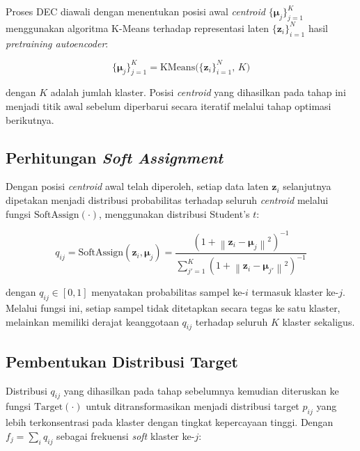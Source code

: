 Proses DEC diawali dengan menentukan posisi awal \textit{centroid}
$\{\boldsymbol{\mu}_j\}_{j=1}^{K}$ menggunakan algoritma K-Means
terhadap representasi laten $\{\mathbf{z}_i\}_{i=1}^{N}$ hasil
\textit{pretraining autoencoder}:

\begin{equation}
    \{\boldsymbol{\mu}_j\}_{j=1}^{K} = \text{KMeans}\big(\{\mathbf{z}_i\}_{i=1}^{N},\, K\big)
    \label{eq:kmeans_init}
\end{equation}

\noindent dengan $K$ adalah jumlah klaster. Posisi \textit{centroid} yang
dihasilkan pada tahap ini menjadi titik awal sebelum diperbarui secara
iteratif melalui tahap optimasi berikutnya.

\subsection{Perhitungan \textit{Soft Assignment}}

Dengan posisi \textit{centroid} awal telah diperoleh, setiap data laten
$\mathbf{z}_i$ selanjutnya dipetakan menjadi distribusi probabilitas
terhadap seluruh \textit{centroid} melalui fungsi
$\text{SoftAssign}(\cdot)$, menggunakan distribusi Student's $t$:

\begin{equation}
    q_{ij} = \text{SoftAssign}(\mathbf{z}_i, \boldsymbol{\mu}_j)
    = \frac{\left(1 + \left\|\mathbf{z}_i -
    \boldsymbol{\mu}_j\right\|^2\right)^{-1}}
    {\displaystyle\sum_{j'=1}^{K}\left(1 + \left\|\mathbf{z}_i -
    \boldsymbol{\mu}_{j'}\right\|^2\right)^{-1}}
    \label{eq:soft_assign}
\end{equation}

\noindent dengan $q_{ij} \in [0,1]$ menyatakan probabilitas sampel
ke-$i$ termasuk klaster ke-$j$. Melalui fungsi ini, setiap sampel tidak
ditetapkan secara tegas ke satu klaster, melainkan memiliki derajat
keanggotaan $q_{ij}$ terhadap seluruh $K$ klaster sekaligus.

\subsection{Pembentukan Distribusi Target}

Distribusi $q_{ij}$ yang dihasilkan pada tahap sebelumnya kemudian
diteruskan ke fungsi $\text{Target}(\cdot)$ untuk ditransformasikan
menjadi distribusi target $p_{ij}$ yang lebih terkonsentrasi pada
klaster dengan tingkat kepercayaan tinggi. Dengan $f_j = \sum_{i} q_{ij}$
sebagai frekuensi \textit{soft} klaster ke-$j$:

